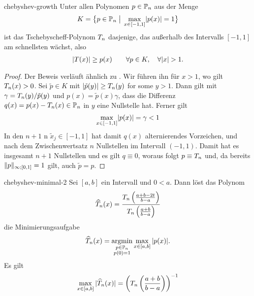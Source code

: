 \begin{Lemma}{chebyshev-growth}
  Unter allen Polynomen $p \in \P_n$ aus der Menge
  \begin{gather}
    K = \bigl\{ p\in \P_n \;\big|\; \max_{x\in[-1,1]} \abs{p(x)} =1 \bigr\}
  \end{gather}
  ist das Tschebyscheff-Polynom $\pchebyshev_n$ dasjenige, das
  außerhalb des Intervalls $[-1,1]$ am schnellsten wächst, also
  \begin{gather}
    \abs{T(x)} \ge p(x) \qquad \forall p\in K, \quad \forall \abs{x} > 1.
  \end{gather}
\end{Lemma}

\begin{proof}
  Der Beweis verläuft ähnlich zu
  . Wir führen ihn für $x>1$, wo
  gilt $\pchebyshev_n(x) > 0$. Sei $\tilde p\in K$ mit
  $\abs{\tilde p(y)} \ge \pchebyshev_n(y)$ for some $y>1$. Dann gilt mit
  $\gamma = \pchebyshev_n(y)/\tilde p(y)$ und
  $p(x) = \tilde p(x)\gamma$, dass die Differenz
  $q(x) = p(x) - \pchebyshev_n(x) \in \P_n$ in $y$ eine Nullstelle hat.
  Ferner gilt
  \begin{gather}
    \max_{x\in[-1,1]} \abs{p(x)} =\gamma < 1
  \end{gather}
  In den $n+1$ n
  $\tilde x_j\in[-1,1]$ hat damit $q(x)$ alternierendes Vorzeichen,
  und nach dem Zwischenwertsatz $n$ Nullstellen im Intervall
  $(-1,1)$. Damit hat es insgesamt $n+1$ Nullstellen und es gilt
  $q \equiv 0$, woraus folgt $p \equiv \pchebyshev_n$ und, da bereits
  $\norm{p}_{\infty;[0,1]} = 1$ gilt, auch $\tilde p = p$.
\end{proof}

\begin{Korollar}{chebyshev-minimal-2}
  Sei $[a,b]$ ein Intervall und $0 < a$. Dann löst das
  Polynom
  \begin{gather}
    \widehat \pchebyshev_n(x)
    = \frac{\pchebyshev_n\left(\frac{a+b-2t}{b-a}\right)}%
    {\pchebyshev_n\left(\frac{a+b}{b-a}\right)}
  \end{gather}
  die Minimierungsaufgabe
  \begin{gather}
    \widehat \pchebyshev_n(x)
    = \operatorname*{argmin}_{\substack{p\in\P_n\\p(0) = 1}}
    \max_{x\in[a,b]}{\abs{p(x)}}.
  \end{gather}
  Es gilt
  \begin{gather}
    \label{eq:chebyshev-cg1}
    \max_{x\in[a,b]}{\abs{\widehat \pchebyshev_n(x)}}
    = \left(\pchebyshev_n\left(\frac{a+b}{b-a}\right)\right)^{-1}
  \end{gather}
\end{Korollar}

